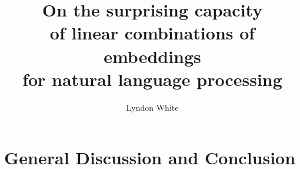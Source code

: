 \documentclass{book}
\title{\Huge \sffamily On the surprising capacity\\ of linear combinations of embeddings\\ for natural language processing}
\author{Lyndon White}
\begin{document}
\maketitle
\tableofcontents






\part{General Discussion and Conclusion}



\end{document}
